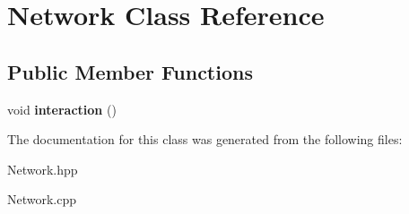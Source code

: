 \hypertarget{classNetwork}{\section{Network Class Reference}
\label{classNetwork}
}
\subsection*{Public Member Functions}
\begin{DoxyCompactItemize}
\item 
\hypertarget{classNetwork_a4d752c12eae960a3d68d5ca2da10c64d}{void {\bfseries interaction} ()}\label{classNetwork_a4d752c12eae960a3d68d5ca2da10c64d}

\end{DoxyCompactItemize}


The documentation for this class was generated from the following files\-:\begin{DoxyCompactItemize}
\item 
Network.\-hpp\item 
Network.\-cpp\end{DoxyCompactItemize}
